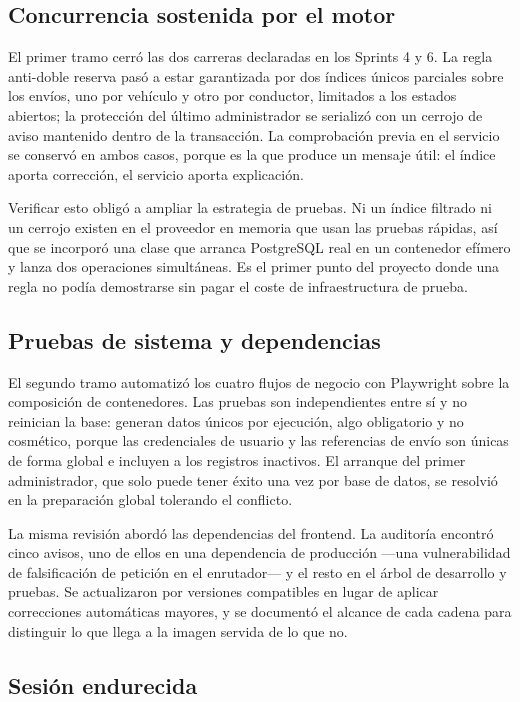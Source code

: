 \subsection*{Concurrencia sostenida por el motor}

El primer tramo cerró las dos carreras declaradas en los Sprints 4 y 6. La regla anti-doble reserva pasó a estar garantizada por dos índices únicos parciales sobre los envíos, uno por vehículo y otro por conductor, limitados a los estados abiertos; la protección del último administrador se serializó con un cerrojo de aviso mantenido dentro de la transacción. La comprobación previa en el servicio se conservó en ambos casos, porque es la que produce un mensaje útil: el índice aporta corrección, el servicio aporta explicación.

Verificar esto obligó a ampliar la estrategia de pruebas. Ni un índice filtrado ni un cerrojo existen en el proveedor en memoria que usan las pruebas rápidas, así que se incorporó una clase que arranca PostgreSQL real en un contenedor efímero y lanza dos operaciones simultáneas. Es el primer punto del proyecto donde una regla no podía demostrarse sin pagar el coste de infraestructura de prueba.

\subsection*{Pruebas de sistema y dependencias}

El segundo tramo automatizó los cuatro flujos de negocio con Playwright sobre la composición de contenedores. Las pruebas son independientes entre sí y no reinician la base: generan datos únicos por ejecución, algo obligatorio y no cosmético, porque las credenciales de usuario y las referencias de envío son únicas de forma global e incluyen a los registros inactivos. El arranque del primer administrador, que solo puede tener éxito una vez por base de datos, se resolvió en la preparación global tolerando el conflicto.

La misma revisión abordó las dependencias del frontend. La auditoría encontró cinco avisos, uno de ellos en una dependencia de producción ---una vulnerabilidad de falsificación de petición en el enrutador--- y el resto en el árbol de desarrollo y pruebas. Se actualizaron por versiones compatibles en lugar de aplicar correcciones automáticas mayores, y se documentó el alcance de cada cadena para distinguir lo que llega a la imagen servida de lo que no.

\subsection*{Sesión endurecida}

